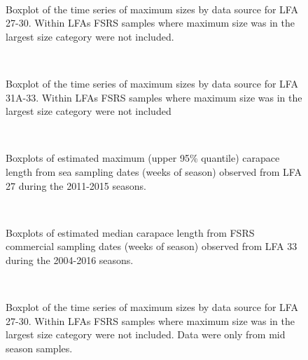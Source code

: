 \documentclass[11pt]{article}
\newcommand{\e}{/backup/bio_data/bio.lobster/figures/} %
\begin{document}

\begin{figure}
        \centering
         \\
                     \caption{Boxplot of the time series of maximum sizes by data source for LFA 27-30. Within LFAs FSRS samples where maximum size was in the largest size category were not included.}
        \end{figure}

\begin{figure}
        \centering
         \\
                     \caption{Boxplot of the time series of maximum sizes by data source for LFA 31A-33. Within LFAs FSRS samples where maximum size was in the largest size category were not included}
        \end{figure}

\begin{figure}
        \centering
         \\
                     \caption{Boxplots of estimated maximum (upper 95\% quantile) carapace length from sea sampling dates (weeks of season) observed from LFA 27 during the 2011-2015 seasons. }
        \end{figure}

\begin{figure}
        \centering
         \\
                     \caption{Boxplots of estimated median carapace length from FSRS commercial sampling dates (weeks of season) observed from LFA 33 during the 2004-2016 seasons. }
        \end{figure}
\begin{figure}
        \centering
         \\
                     \caption{Boxplot of the time series of maximum sizes by data source for LFA 27-30. Within LFAs FSRS samples where maximum size was in the largest size category were not included. Data were only from mid season samples.}
        \end{figure}
\end{document}
